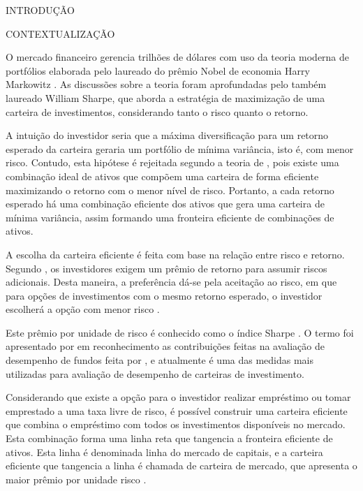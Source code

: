\begin{section}{INTRODUÇÃO}

    \begin{subsection}{CONTEXTUALIZAÇÃO}

        \ipar O mercado financeiro gerencia trilhões de dólares com uso da teoria moderna de portfólios elaborada pelo laureado do prêmio Nobel de economia Harry Markowitz \cite{sethi2021nobel}. As discussões sobre a teoria foram aprofundadas pelo também laureado William Sharpe, que aborda a estratégia de maximização de uma carteira de investimentos, considerando tanto o risco quanto o retorno. 
        
        \ipar A intuição do investidor seria que a máxima diversificação para um retorno esperado da carteira geraria um portfólio de mínima variância, isto é, com menor risco. Contudo, esta hipótese é rejeitada segundo a teoria de , pois existe uma combinação ideal de ativos que compõem uma carteira de forma eficiente maximizando o retorno com o menor nível de risco. Portanto, a cada retorno esperado há uma combinação eficiente dos ativos que gera uma carteira de mínima variância, assim formando uma fronteira eficiente de combinações de ativos.

        \ipar A escolha da carteira eficiente é feita com base na relação entre risco e retorno. Segundo , os investidores exigem um prêmio de retorno para assumir riscos adicionais. Desta maneira, a preferência dá-se pela aceitação ao risco, em que para opções de investimentos com o mesmo retorno esperado, o investidor escolherá a opção com menor risco \cite{lintner1965valuation}.
        
        \ipar Este prêmio por unidade de risco é conhecido como o índice Sharpe \cite{sharpe1994sharpe}. O termo foi apresentado por  em reconhecimento as contribuições feitas na avaliação de desempenho de fundos feita por , e atualmente é uma das medidas mais utilizadas para avaliação de desempenho de carteiras de investimento.

        \ipar Considerando que existe a opção para o investidor realizar empréstimo ou tomar emprestado a uma taxa livre de risco, é possível construir uma carteira eficiente que combina o empréstimo com todos os investimentos disponíveis no mercado. Esta combinação forma uma linha reta que tangencia a fronteira eficiente de ativos. Esta linha é denominada linha do mercado de capitais, e a carteira eficiente que tangencia a linha é chamada de carteira de mercado, que apresenta o maior prêmio por unidade risco \cite{sharpe1964capital}.


\end{subsection}
\end{section}
